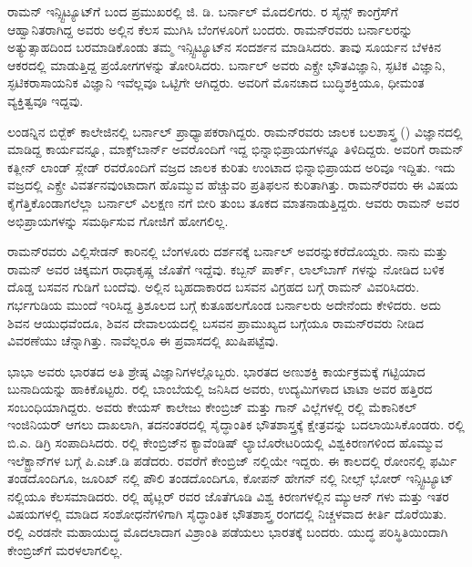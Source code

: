 
ರಾಮನ್ ಇನ್ಸ್ಟಿಟ್ಯೂಟ್‍ಗೆ ಬಂದ ಪ್ರಮುಖರಲ್ಲಿ ಜಿ. ಡಿ. ಬರ್ನಾಲ್ ಮೊದಲಿಗರು. ರ ಸೈನ್ಸ್ ಕಾಂಗ್ರೆಸ್‍ಗೆ ಆಹ್ವಾನಿತರಾಗಿದ್ದ ಅವರು ಅಲ್ಲಿನ ಕೆಲಸ ಮುಗಿಸಿ ಬೆಂಗಳೂರಿಗೆ ಬಂದರು. ರಾಮನ್‍ರವರು ಬರ್ನಾಲರನ್ನು ಅತ್ಯುತ್ಸಾಹದಿಂದ ಬರಮಾಡಿಕೊಂಡು ತಮ್ಮ ಇನ್ಸ್ಟಿಟ್ಯೂಟ್‍ನ ಸಂದರ್ಶನ ಮಾಡಿಸಿದರು. ತಾವು ಸೂರ್ಯನ ಬೆಳಕಿನ ಆಕರದಲ್ಲಿ ಮಾಡುತ್ತಿದ್ದ ಪ್ರಯೋಗಗಳನ್ನು ತೋರಿಸಿದರು. ಬರ್ನಾಲ್ ಅವರು ಎಕ್ಸ್\enginline{-}ರೇ ಭೌತವಿಜ್ಞಾನಿ, ಸ್ಫಟಿಕ ವಿಜ್ಞಾನಿ, ಸ್ಫಟಿಕರಾಸಾಯನಿಕ ವಿಜ್ಞಾನಿ ಇವೆಲ್ಲವೂ ಒಟ್ಟಿಗೇ ಆಗಿದ್ದರು. ಅವರಿಗೆ ಮೊನಚಾದ ಬುದ್ಧಿಶಕ್ತಿಯೂ, ಧೀಮಂತ ವ್ಯಕ್ತಿತ್ವವೂ ಇದ್ದವು.

ಲಂಡನ್ನಿನ ಬಿರ್‍ಬೆಕ್ ಕಾಲೇಜಿನಲ್ಲಿ ಬರ್ನಾಲ್ ಪ್ರಾಧ್ಯಾಪಕರಾಗಿದ್ದರು. ರಾಮನ್‍ರವರು ಜಾಲಕ ಬಲಶಾಸ್ತ್ರ () ವಿಜ್ಞಾನದಲ್ಲಿ ಮಾಡಿದ್ದ ಕಾರ್ಯವನ್ನೂ, ಮಾಕ್ಸ್‌ಬಾರ್ನ್ ಅವರೊಂದಿಗೆ ಇದ್ದ ಭಿನ್ನಾಭಿಪ್ರಾಯಗಳನ್ನೂ ತಿಳಿದಿದ್ದರು. ಅವರಿಗೆ ರಾಮನ್ ಕತ್ಲೀನ್ ಲಾಂಡ್ ಸ್ಲೇಡ್ ರವರೊಂದಿಗೆ ವಜ್ರದ ಜಾಲಕ ಕುರಿತು ಉಂಟಾದ ಭಿನ್ನಾಭಿಪ್ರಾಯದ ಅರಿವೂ ಇದ್ದಿತು. ಇದು ವಜ್ರದಲ್ಲಿ ಎಕ್ಸ್\enginline{-}ರೇ ವಿವರ್ತನವುಂಟಾದಾಗ ಹೊಮ್ಮುವ ಹೆಚ್ಚುವರಿ ಪ್ರತಿಫಲನ ಕುರಿತಾಗಿತ್ತು. ರಾಮನ್‍ರವರು ಈ ವಿಷಯ ಕೈಗೆತ್ತಿಕೊಂಡಾಗಲೆಲ್ಲಾ ಬರ್ನಾಲ್ ವಿಲಕ್ಷಣ ನಗೆ ಬೀರಿ ತುಂಬ ತೂಕದ ಮಾತ\-ನಾಡುತ್ತಿದ್ದರು. ಆವರು ರಾಮನ್ ಅವರ ಅಭಿಪ್ರಾಯಗಳನ್ನು ಸಮರ್ಥಿಸುವ ಗೋಜಿಗೆ ಹೋಗಲಿಲ್ಲ.

ರಾಮನ್‍ರವರು ವಿಲ್ಲಿಸೇಡನ್ ಕಾರಿನಲ್ಲಿ ಬೆಂಗಳೂರು ದರ್ಶನಕ್ಕೆ ಬರ್ನಾಲ್ ಅವರನ್ನು\break ಕರೆದೊಯ್ದರು. ನಾನು ಮತ್ತು ರಾಮನ್ ಅವರ ಚಿಕ್ಕಮಗ ರಾಧಾಕೃಷ್ಣ ಜೊತೆಗೆ ಇದ್ದೆವು. ಕಬ್ಬನ್ ಪಾರ್ಕ್, ಲಾಲ್‍ಬಾಗ್ ಗಳನ್ನು ನೋಡಿದ ಬಳಿಕ ದೊಡ್ಡ ಬಸವನ ಗುಡಿಗೆ ಬಂದೆವು. ಅಲ್ಲಿನ ಬೃಹದಾಕಾರದ ಬಸವನ ವಿಗ್ರಹದ ಬಗ್ಗೆ ರಾಮನ್ ವಿವರಿಸಿದರು. ಗರ್ಭಗುಡಿಯ ಮುಂದೆ ಇರಿಸಿದ್ದ ತ್ರಿಶೂಲದ ಬಗ್ಗೆ ಕುತೂಹಲಗೊಂಡ ಬರ್ನಾಲರು ಅದೇನೆಂದು ಕೇಳಿದರು. ಅದು ಶಿವನ ಆಯುಧವೆಂದೂ, ಶಿವನ ದೇವಾಲಯದಲ್ಲಿ ಬಸವನ ಪ್ರಾಮುಖ್ಯದ ಬಗ್ಗೆಯೂ ರಾಮನ್‍ರವರು ನೀಡಿದ ವಿವರಣೆಯು ಚೆನ್ನಾಗಿತ್ತು. ನಾವೆಲ್ಲರೂ ಈ ಪ್ರವಾಸದಲ್ಲಿ ಖುಷಿಪಟ್ಟೆವು.



ಭಾಭಾ ಅವರು ಭಾರತದ ಅತಿ ಶ್ರೇಷ್ಠ ವಿಜ್ಞಾನಿಗಳಲ್ಲೊಬ್ಬರು. ಭಾರತದ ಅಣುಶಕ್ತಿ ಕಾರ್ಯ\-ಕ್ರಮಕ್ಕೆ ಗಟ್ಟಿಯಾದ ಬುನಾದಿಯನ್ನು ಹಾಕಿಕೊಟ್ಟರು. ರಲ್ಲಿ ಬಾಂಬೆಯಲ್ಲಿ ಜನಿಸಿದ ಅವರು, ಉದ್ಯಮಿಗಳಾದ ಟಾಟಾ ಅವರ ಹತ್ತಿರದ ಸಂಬಂಧಿಯಾಗಿದ್ದರು. ಅವರು ಕೇಯಸ್ ಕಾಲೇಜು ಕೇಂಬ್ರಿಜ್ ಮತ್ತು ಗಾನ್ ವಿಲ್ಲೆಗಳಲ್ಲಿ ರಲ್ಲಿ ಮೆಕಾನಿಕಲ್ ಇಂಜಿನಿಯರ್ ಆಗಲು ದಾಖಲಾಗಿ, ತದನಂತರದಲ್ಲಿ ಸೈದ್ಧಾಂತಿಕ ಭೌತಶಾಸ್ತ್ರಕ್ಕೆ ಕ್ಷೇತ್ರವನ್ನು ಬದಲಾಯಿಸಿಕೊಂಡರು. ರಲ್ಲಿ ಬಿ.ಎ. ಡಿಗ್ರಿ ಸಂಪಾದಿಸಿದರು. ರಲ್ಲಿ ಕೇಂಬ್ರಿಜ್‍ನ ಕ್ಯಾವೆಂಡಿಷ್ ಲ್ಯಾಬೊರೇಟರಿಯಲ್ಲಿ ವಿಶ್ವಕಿರಣ\-ಗಳಿಂದ ಹೊಮ್ಮುವ ಇಲೆಕ್ಟ್ರಾನ್‍ಗಳ ಬಗ್ಗೆ ಪಿ.ಎಚ್.ಡಿ ಪಡೆದರು. ರವರೆಗೆ ಕೇಂಬ್ರಿಜ್ ನಲ್ಲಿಯೇ ಇದ್ದರು. ಈ ಕಾಲದಲ್ಲಿ ರೋಂನಲ್ಲಿ ಫರ್ಮಿ ತಂಡದೊಂದಿಗೂ, ಜೂರಿಖ್ ನಲ್ಲಿ ಪೌಲಿ ತಂಡದೊಂದಿಗೂ, ಕೋಪನ್ ಹೇಗನ್ ನಲ್ಲಿ ನೀಲ್ಸ್ ಭೋರ್ ಇನ್ಸ್ಟಿಟ್ಯೂಟ್ ನಲ್ಲಿಯೂ ಕೆಲಸಮಾಡಿದರು. ರಲ್ಲಿ ಹೈಟ್ಲರ್ ರವರ ಜೊತೆಗೂಡಿ ವಿಶ್ವ ಕಿರಣಗಳಲ್ಲಿನ ಮ್ಯುಆನ್ ಗಳು ಮತ್ತು ಇತರ ವಿಷಯಗಳಲ್ಲಿ ಮಾಡಿದ ಸಂಶೋಧನೆಗಳಿಗಾಗಿ ಸೈದ್ಧಾಂತಿಕ ಭೌತಶಾಸ್ತ್ರ ರಂಗದಲ್ಲಿ ನಿಚ್ಚಳವಾದ ಕೀರ್ತಿ ದೊರೆಯಿತು. ರಲ್ಲಿ ಎರಡನೇ ಮಹಾಯುದ್ಧ ಮೊದಲಾದಾಗ ವಿಶ್ರಾಂತಿ ಪಡೆಯಲು ಭಾರತಕ್ಕೆ ಬಂದರು. ಯುದ್ಧ ಪರಿಸ್ಥಿತಿಯಿಂದಾಗಿ ಕೇಂಬ್ರಿಜ್‍ಗೆ ಮರಳಲಾಗಲಿಲ್ಲ.

